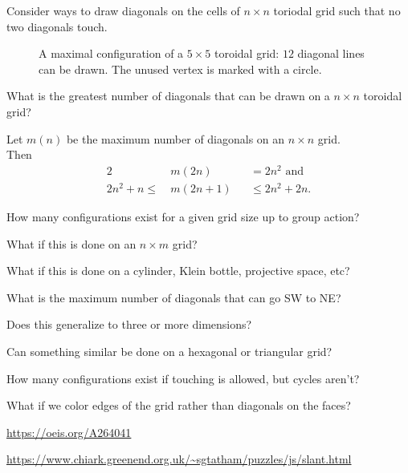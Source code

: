 \documentclass{article}
\begin{document}
Consider ways to draw diagonals on the cells of $n \times n$ toriodal grid such
that no two diagonals touch.
\begin{figure}[ht!]
  \centering
  \caption{
    A maximal configuration of a $5 \times 5$ toroidal grid: $12$ diagonal lines
    can be drawn. The unused vertex is marked with a circle.
  }
\end{figure}
\begin{question}
  What is the greatest number of diagonals that can be drawn on a $n \times n$
  toroidal grid?
\end{question}

\begin{note}
  Let $m(n)$ be the maximum number of diagonals on an $n \times n$ grid.\\
  Then \begin{alignat*}{2}
  & m(2n) &&= 2n^2 \text{ and}\\
  2n^2 + n \leq\ & m(2n + 1) &&\leq 2n^2 + 2n.
\end{alignat*}
\end{note}

\begin{related}
  \item How many configurations exist for a given grid size up to group action?
  \item What if this is done on an $n \times m$ grid?
  \item What if this is done on a cylinder, Klein bottle, projective space, etc?
  \item What is the maximum number of diagonals that can go SW to NE?
  \item Does this generalize to three or more dimensions?
  \item Can something similar be done on a hexagonal or triangular grid?
  \item How many configurations exist if touching is allowed, but cycles aren't?
  \item What if we color edges of the grid rather than diagonals on the faces?
\end{related}

\begin{references}
  \item \url{https://oeis.org/A264041}
  \item \url{https://www.chiark.greenend.org.uk/~sgtatham/puzzles/js/slant.html}
\end{references}
\end{document}
